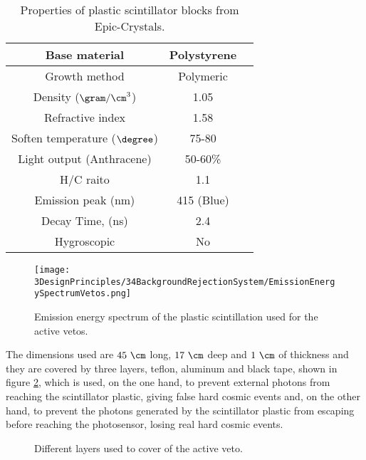 \begin{table}[h]
\begin{center}
\begin{tabular}{|c|c|c|}
\hline \hline 
Base material & Polystyrene \\ \hline
Growth method & Polymeric \\ \hline
Density ($\gram/\cm^3$)& 1.05 \\ \hline
Refractive index & 1.58 \\ \hline
Soften temperature ($\degree$) & 75-80 \\ \hline
Light output (Anthracene) & 50-60\% \\ \hline
H/C raito & 1.1 \\ \hline
Emission peak (nm) & 415 (Blue) \\ \hline
Decay Time, (ns) & 2.4 \\ \hline
Hygroscopic & No \\ \hline
\end{tabular}
\caption{Properties of plastic scintillator blocks from Epic-Crystals. \cite{ScintillatorVeto}}
\label{tab:ParametersScintillatorVeto}
\end{center}
\end{table}

\begin{figure}[h]
\centering
\texttt{[image: 3DesignPrinciples/34BackgroundRejectionSystem/EmissionEnergySpectrumVetos.png]}
\caption{Emission energy spectrum of the plastic scintillation used for the active vetos.\label{fig:EmissionEnergySpectrumVeto}~\cite{ScintillatorVeto}}
\end{figure}

The dimensions used are $45~\cm$ long, $17~\cm$ deep and $1~\cm$ of thickness and they are covered by three layers, teflon, aluminum and black tape, shown in figure \ref{fig:LayersVeto}, which is used, on the one hand, to prevent external photons from reaching the scintillator plastic, giving false hard cosmic events and, on the other hand, to prevent the photons generated by the scintillator plastic from escaping before reaching the photosensor, losing real hard cosmic events.

\begin{figure}[h]
 \centering
 \caption{Different layers used to cover of the active veto.}
 \label{fig:LayersVeto}
\end{figure}

